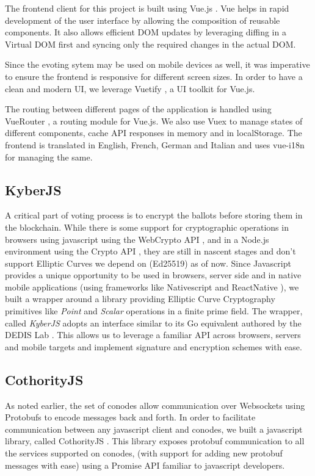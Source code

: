 The frontend client for this project is built using Vue.js \cite{vuejs}. Vue helps in rapid development of the user interface by allowing the composition of reusable components. It also allows efficient DOM updates by leveraging diffing in a Virtual DOM first and syncing only the required changes in the actual DOM.

Since the evoting sytem may be used on mobile devices as well, it was imperative to ensure the frontend is responsive for different screen sizes. In order to have a clean and modern UI, we leverage Vuetify \cite{vuetify}, a UI toolkit for Vue.js.

The routing between different pages of the application is handled using VueRouter \cite{vuerouter}, a routing module for Vue.js. We also use Vuex \cite{vuex} to manage states of different components, cache API responses in memory and in localStorage. The frontend is translated in English, French, German and Italian and uses vue-i18n \cite{vuei18n} for managing the same.

\subsection{KyberJS}
A critical part of voting process is to encrypt the ballots before storing them in the blockchain. While there is some support for cryptographic operations in browsers using javascript using the WebCrypto API \cite{webcrypto}, and in a Node.js environment using the Crypto API \cite{nodecrypto}, they are still in nascent stages and don't support Elliptic Curves we depend on (Ed25519) as of now. Since Javascript provides a unique opportunity to be used in browsers, server side and in native mobile applications (using frameworks like Nativescript \cite{nativescript} and ReactNative \cite{reactnative}), we built a wrapper around a library \cite{elliptic} providing Elliptic Curve Cryptography primitives like \emph{Point} and \emph{Scalar} operations in a finite prime field. The wrapper, called \textit{KyberJS} \cite{kyberjs} adopts an interface similar to its Go equivalent authored by the DEDIS Lab \cite{kyber}. This allows us to leverage a familiar API across browsers, servers and mobile targets and implement signature and encryption schemes with ease.

\subsection{CothorityJS}
As noted earlier, the set of conodes allow communication over Websockets using Protobufs to encode messages back and forth. In order to facilitate communication between any javascript client and conodes, we built a javascript library, called CothorityJS \cite{cothorityjs}. This library exposes protobuf communication to all the services supported on conodes, (with support for adding new protobuf messages with ease) using a Promise API familiar to javascript developers.